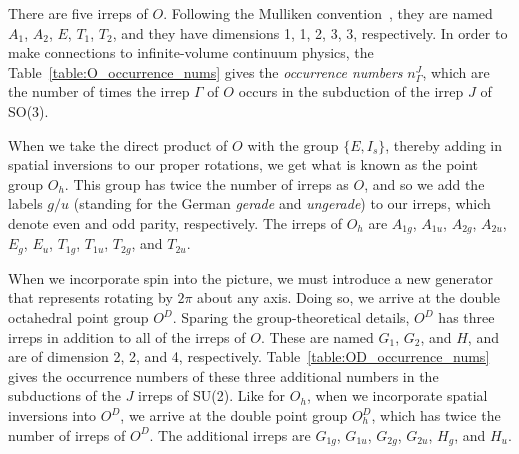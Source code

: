     There are five irreps of $O$. Following the Mulliken convention~\cite{}, they are named $A_1$, $A_2$, $E$, $T_1$, $T_2$, and they have dimensions 1, 1, 2, 3, 3, respectively. In order to make connections to infinite-volume continuum physics, the Table~\ref{table:O_occurrence_nums} gives the \emph{occurrence numbers} $n_\Gamma^J$, which are the number of times the irrep $\Gamma$ of $O$ occurs in the subduction of the irrep $J$ of SO(3).

    When we take the direct product of $O$ with the group $\lbrace E,I_s \rbrace$, thereby adding in spatial inversions to our proper rotations, we get what is known as the point group $O_h$. This group has twice the number of irreps as $O$, and so we add the labels $g/u$ (standing for the German \emph{gerade} and \emph{ungerade}) to our irreps, which denote even and odd parity, respectively. The irreps of $O_h$ are $A_{1g}$, $A_{1u}$, $A_{2g}$, $A_{2u}$, $E_g$, $E_u$, $T_{1g}$, $T_{1u}$, $T_{2g}$, and $T_{2u}$.

    When we incorporate spin into the picture, we must introduce a new generator that represents rotating by $2\pi$ about any axis. Doing so, we arrive at the double octahedral point group $O^D$. Sparing the group-theoretical details, $O^D$ has three irreps in addition to all of the irreps of $O$. These are named $G_1$, $G_2$, and $H$, and are of dimension 2, 2, and 4, respectively. Table~\ref{table:OD_occurrence_nums} gives the occurrence numbers of these three additional numbers in the subductions of the $J$ irreps of SU(2). Like for $O_h$, when we incorporate spatial inversions into $O^D$, we arrive at the double point group $O_h^D$, which has twice the number of irreps of $O^D$. The additional irreps are $G_{1g}$, $G_{1u}$, $G_{2g}$, $G_{2u}$, $H_g$, and $H_u$.

